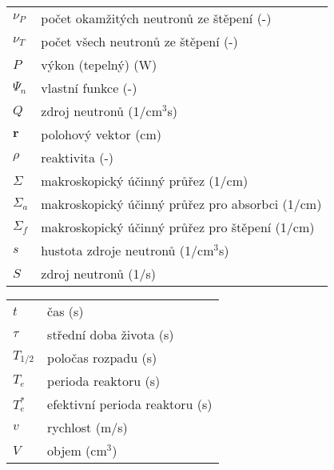 \begin{table}[H]
\begin{tabular}{p{1cm}l}
  $\nu_P$         & počet okamžitých neutronů ze štěpení (-) \\
  $\nu_T$         & počet všech neutronů ze štěpení (-) \\
  $P$             & výkon (tepelný) (W) \\
  $\Psi_n$        & vlastní funkce (-) \\
  $Q$             & zdroj neutronů (1/cm$^3$s) \\
  $\textbf{r}$    & polohový vektor (cm) \\
  $\rho$          & reaktivita (-) \\
  $\Sigma$        & makroskopický účinný průřez (1/cm) \\
  $\Sigma_a$      & makroskopický účinný průřez pro absorbci (1/cm) \\
  $\Sigma_f$      & makroskopický účinný průřez pro štěpení (1/cm) \\
  $s$             & hustota zdroje neutronů (1/cm$^3$s) \\
  $S$             & zdroj neutronů (1/s) \\
\end{tabular}
\end{table}
\renewcommand{\arraystretch}{1}

\renewcommand{\arraystretch}{1.2}
\begin{table}[H]
\begin{tabular}{p{1cm}l}
  $t$             & čas (s) \\
  $\tau$          & střední doba života (s) \\
  $T_{1/2}$       & poločas rozpadu (s) \\
  $T_e$           & perioda reaktoru (s) \\
  $T_e^*$         & efektivní perioda reaktoru (s) \\
  $v$             & rychlost (m/s) \\
  $V$             & objem (cm$^3$) \\
\end{tabular}
\end{table}
\renewcommand{\arraystretch}{1}
